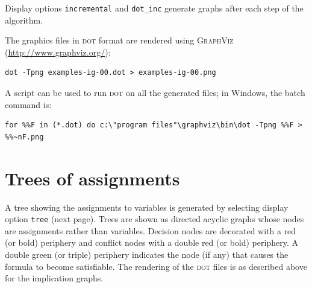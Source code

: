 \documentclass[11pt]{article}
\newcommand*{\p}[1]{\textup{\texttt{#1}}}
\newcommand*{\dt}{\textsc{dot}}
\begin{document}
Display options \p{incremental} and \p{dot\_inc} generate graphs after
each step of the algorithm.

The graphics files in \dt{} format are rendered using
\textsc{GraphViz} (\url{http://www.graphviz.org/}):

\begin{verbatim}
dot -Tpng examples-ig-00.dot > examples-ig-00.png
\end{verbatim}

A script can be used to run \dt{} on all the generated files; in
Windows, the batch command is:

\begin{verbatim}
for %%F in (*.dot) do c:\"program files"\graphviz\bin\dot -Tpng %%F > %%~nF.png
\end{verbatim}


\section{Trees of assignments}

A tree showing the assignments to variables is generated by selecting
display option \p{tree} (next page). Trees are shown as directed acyclic
graphs whose nodes are assignments rather than variables. Decision nodes
are decorated with a red (or bold) periphery and conflict nodes with a
double red (or bold) periphery. A double green (or triple) periphery
indicates the node (if any) that causes the formula to become
satisfiable. The rendering of the \dt{} files is as described above for
the implication graphs.

\newpage

\vfill
\end{document}
